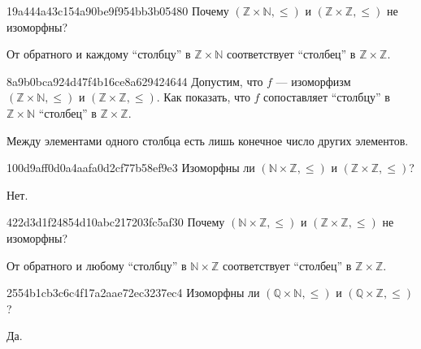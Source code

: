 \begin{note}{19a444a43c154a90be9f954bb3b05480}
    Почему \({ (\mathbb Z \times \mathbb N, \leqslant) }\) и \({ (\mathbb Z \times \mathbb Z, \leqslant) }\) не изоморфны?

    \begin{cloze}{1}
        От обратного и каждому ``столбцу'' в \({ \mathbb Z \times \mathbb N }\) соответствует ``столбец'' в \({ \mathbb Z \times \mathbb Z }\).
    \end{cloze}
\end{note}

\begin{note}{8a9b0bca924d47f4b16ce8a629424644}
    Допустим, что \({ f }\) --- изоморфизм \({ (\mathbb Z \times \mathbb N, \leqslant) }\) и \({ (\mathbb Z \times \mathbb Z, \leqslant) }\).
    Как показать, что \({ f }\) сопоставляет ``столбцу'' в \({ \mathbb Z \times \mathbb N }\) ``столбец'' в \({ \mathbb Z \times \mathbb Z }\).

    \begin{cloze}{1}
        Между элементами одного столбца есть лишь конечное число других элементов.
    \end{cloze}
\end{note}

\begin{note}{100d9aff0d0a4aafa0d2cf77b58ef9e3}
    Изоморфны ли \({ (\mathbb N \times \mathbb Z, \leqslant) }\) и \({ (\mathbb Z \times \mathbb Z, \leqslant) }\)?

    \begin{cloze}{1}
        Нет.
    \end{cloze}
\end{note}

\begin{note}{422d3d1f24854d10abc217203fc5af30}
    Почему \({ (\mathbb N \times \mathbb Z, \leqslant) }\) и \({ (\mathbb Z \times \mathbb Z, \leqslant) }\) не изоморфны?

    \begin{cloze}{1}
        От обратного и любому ``столбцу'' в \({ \mathbb N \times \mathbb Z }\) соответствует ``столбец'' в \({ \mathbb Z \times \mathbb Z }\).
    \end{cloze}
\end{note}

\begin{note}{2554b1cb3c6c4f17a2aae72ec3237ec4}
    Изоморфны ли \({ (\mathbb Q \times \mathbb N, \leqslant) }\) и \({ (\mathbb Q \times \mathbb Z, \leqslant) }\)?

    \begin{cloze}{1}
        Да.
    \end{cloze}
\end{note}


